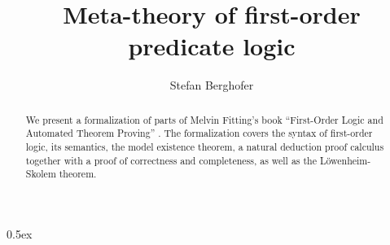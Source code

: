 \documentclass[11pt,a4paper]{article}
\begin{document}
\title{Meta-theory of first-order predicate logic}
\author{Stefan Berghofer}
\maketitle

\begin{abstract}
We present a formalization of parts of Melvin Fitting's book
``First-Order Logic and Automated Theorem Proving'' \cite{Fitting}.
The formalization covers the syntax of first-order logic, its semantics,
the model existence theorem, a natural deduction proof calculus together
with a proof of correctness and completeness, as well as the
L\"owenheim-Skolem theorem.
\end{abstract}

\tableofcontents

\parindent 0pt\parskip 0.5ex





\end{document}
